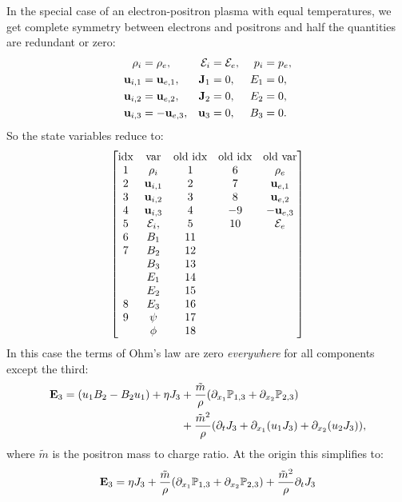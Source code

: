 \documentclass[12pt,fleqn]{article}
\numberwithin{equation}{section}
\begin{document}
In the special case of an electron-positron
plasma with equal temperatures,
we get complete symmetry between electrons and positrons
and half the quantities are redundant or zero:
\begin{align*}
   \rho_i&=\rho_e, &\mathcal{E}_i &= \mathcal{E}_e, & p_i&=p_e,
\\ \mathbf{u}_{i,1}&=  \mathbf{u}_{e,1},    &\mathbf{J}_1 &= 0,  &E_1 &= 0,
\\ \mathbf{u}_{i,2}&=  \mathbf{u}_{e,2},    &\mathbf{J}_2 &= 0,  &E_2 &= 0,
\\ \mathbf{u}_{i,3}&= -\mathbf{u}_{e,3},    &\mathbf{u}_3 &= 0,  &B_3 &= 0.
\end{align*}
So the state variables reduce to:
\begin{align*}
  \begin{bmatrix}
     \hbox{idx} & \mathrm{var} & \hbox{old idx} & \hbox{old idx} & \hbox{old var}
  \\ 1 & \rho_i        & 1  & 6 & \rho_e
  \\ 2 & \mathbf{u}_{i,1}      & 2  & 7 & \mathbf{u}_{e,1}
  \\ 3 & \mathbf{u}_{i,2}      & 3  & 8 & \mathbf{u}_{e,2}
  \\ 4 & \mathbf{u}_{i,3}      & 4  & -9 & -\mathbf{u}_{e,3}
  \\ 5 & \mathcal{E}_i, & 5  & 10 & \mathcal{E}_e
  \\ 6 & B_1           & 11  & &
  \\ 7 & B_2           & 12  & &
  \\   & B_3           & 13  & &
  \\   & E_1           & 14  & &
  \\   & E_2           & 15  & &
  \\ 8 & E_3           & 16  & &
  \\ 9 & \psi          & 17  & &
  \\   & \phi          & 18  & &
  \end{bmatrix}
\end{align*}
In this case the terms of Ohm's law are zero
{\em everywhere} for all components except the third:
\def\m{\tilde m}
\def\Pressure{\mathbb{P}}
\begin{alignat*}{1}
   \E_3 = (u_1 B_2 - B_2 u_1) + \eta J_3
     &+ \frac{\m}{\rho}(\partial_{x_1}\Pressure_{1,3}+\partial_{x_2}\Pressure_{2,3})
 \\
     &+ \frac{\m^2}{\rho}
         (\partial_{t} J_3 + \partial_{x_1}(u_1 J_3) + \partial_{x_2}(u_2 J_3)),
\end{alignat*}
where $\m$ is the positron mass to charge ratio.
At the origin this simplifies to:
\begin{gather*}
   \E_3 = \eta J_3
     + \frac{\m}{\rho}(\partial_{x_1}\Pressure_{1,3}+\partial_{x_2}\Pressure_{2,3})
     + \frac{\m^2}{\rho} \partial_{t} J_3
\end{gather*}
\end{document}
